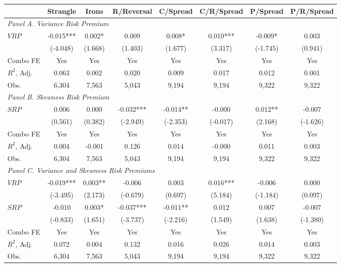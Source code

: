 \begin{tabular}{lccccccc}
\toprule
 & Strangle & Irons & R/Reversal & C/Spread & C/R/Spread & P/Spread & P/R/Spread \\
\midrule
\multicolumn{5}{l}{\emph{Panel A. Variance Risk Premium }}    \\
$VRP$ & -0.015*** & 0.002* & 0.009 & 0.008* & 0.010*** & -0.009* & 0.003 \\
 & (-4.048) & (1.668) & (1.403) & (1.677) & (3.317) & (-1.745) & (0.941) \\
Combo FE & Yes & Yes & Yes & Yes & Yes & Yes & Yes \\
$R^2$,  Adj. & 0.063 & 0.002 & 0.020 & 0.009 & 0.017 & 0.012 & 0.001 \\
Obs. & 6,304 & 7,563 & 5,043 & 9,194 & 9,194 & 9,322 & 9,322 \\
\midrule
\multicolumn{5}{l}{\emph{Panel B. Skewness Risk Premium}}  \\
$SRP$ & 0.006 & 0.000 & -0.032*** & -0.014** & -0.000 & 0.012** & -0.007 \\
 & (0.561) & (0.382) & (-2.949) & (-2.353) & (-0.017) & (2.168) & (-1.626) \\
Combo FE & Yes & Yes & Yes & Yes & Yes & Yes & Yes \\
$R^2$,  Adj. & 0.004 & -0.001 & 0.126 & 0.014 & -0.000 & 0.011 & 0.003 \\
Obs. & 6,304 & 7,563 & 5,043 & 9,194 & 9,194 & 9,322 & 9,322 \\
\midrule
\multicolumn{5}{l}{\emph{Panel C. Variance and Skewness Risk Premiums}}   \\
$VRP$ & -0.019*** & 0.003** & -0.006 & 0.003 & 0.016*** & -0.006 & 0.000 \\
 & (-3.495) & (2.173) & (-0.679) & (0.697) & (5.184) & (-1.184) & (0.097) \\
$SRP$ & -0.010 & 0.003* & -0.037*** & -0.011** & 0.012 & 0.007 & -0.007 \\
 & (-0.833) & (1.651) & (-3.737) & (-2.216) & (1.549) & (1.638) & (-1.380) \\
Combo FE & Yes & Yes & Yes & Yes & Yes & Yes & Yes \\
$R^2$,  Adj. & 0.072 & 0.004 & 0.132 & 0.016 & 0.026 & 0.014 & 0.003 \\
Obs. & 6,304 & 7,563 & 5,043 & 9,194 & 9,194 & 9,322 & 9,322 \\
\bottomrule
\end{tabular}
